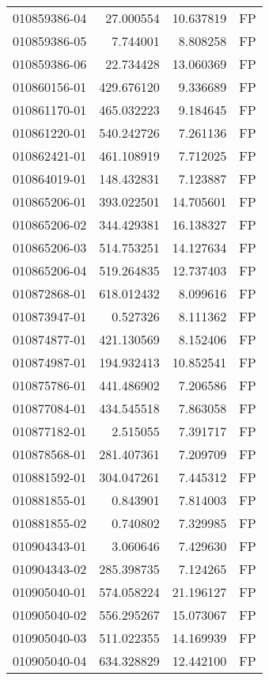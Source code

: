 \begin{tabular}{lrrl}
010859386-04 &   27.000554 &    10.637819 &   FP \\
010859386-05 &    7.744001 &     8.808258 &   FP \\
010859386-06 &   22.734428 &    13.060369 &   FP \\
010860156-01 &  429.676120 &     9.336689 &   FP \\
010861170-01 &  465.032223 &     9.184645 &   FP \\
010861220-01 &  540.242726 &     7.261136 &   FP \\
010862421-01 &  461.108919 &     7.712025 &   FP \\
010864019-01 &  148.432831 &     7.123887 &   FP \\
010865206-01 &  393.022501 &    14.705601 &   FP \\
010865206-02 &  344.429381 &    16.138327 &   FP \\
010865206-03 &  514.753251 &    14.127634 &   FP \\
010865206-04 &  519.264835 &    12.737403 &   FP \\
010872868-01 &  618.012432 &     8.099616 &   FP \\
010873947-01 &    0.527326 &     8.111362 &   FP \\
010874877-01 &  421.130569 &     8.152406 &   FP \\
010874987-01 &  194.932413 &    10.852541 &   FP \\
010875786-01 &  441.486902 &     7.206586 &   FP \\
010877084-01 &  434.545518 &     7.863058 &   FP \\
010877182-01 &    2.515055 &     7.391717 &   FP \\
010878568-01 &  281.407361 &     7.209709 &   FP \\
010881592-01 &  304.047261 &     7.445312 &   FP \\
010881855-01 &    0.843901 &     7.814003 &   FP \\
010881855-02 &    0.740802 &     7.329985 &   FP \\
010904343-01 &    3.060646 &     7.429630 &   FP \\
010904343-02 &  285.398735 &     7.124265 &   FP \\
010905040-01 &  574.058224 &    21.196127 &   FP \\
010905040-02 &  556.295267 &    15.073067 &   FP \\
010905040-03 &  511.022355 &    14.169939 &   FP \\
010905040-04 &  634.328829 &    12.442100 &   FP \\

\end{tabular}
